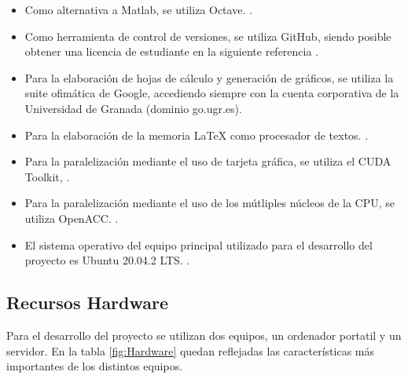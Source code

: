 \begin{itemize}
    \item Como alternativa a Matlab, se utiliza Octave. \cite{unknown-author-2021B}.
    \item Como herramienta de control de versiones, se utiliza GitHub, siendo posible obtener una licencia de estudiante en la siguiente referencia \cite{unknown-author-2021}.
    \item Para la elaboración de hojas de cálculo y generación de gráficos, se utiliza la suite ofimática de Google, accediendo siempre con la cuenta corporativa de la Universidad de Granada (dominio go.ugr.es).
    \item Para la elaboración de la memoria LaTeX como procesador de textos. \cite{unknown-author-no-dateD}.
    \item Para la paralelización mediante el uso de tarjeta gráfica, se utiliza el CUDA Toolkit, \cite{unknown-author-no-date}.
    \item Para la paralelización mediante el uso de los mútliples núcleos de la CPU, se utiliza OpenACC. \cite{unknown-author-no-dateB}.
    \item El sistema operativo del equipo principal utilizado para el desarrollo del proyecto es Ubuntu 20.04.2 LTS. \cite{unknown-author-no-dateE}.
\end{itemize}

\subsection{Recursos Hardware}
\label{RecursosHardware}
Para el desarrollo del proyecto se utilizan dos equipos, un ordenador portatil y un servidor. En la tabla \ref{fig:Hardware} quedan reflejadas las características más importantes de los distintos equipos.

